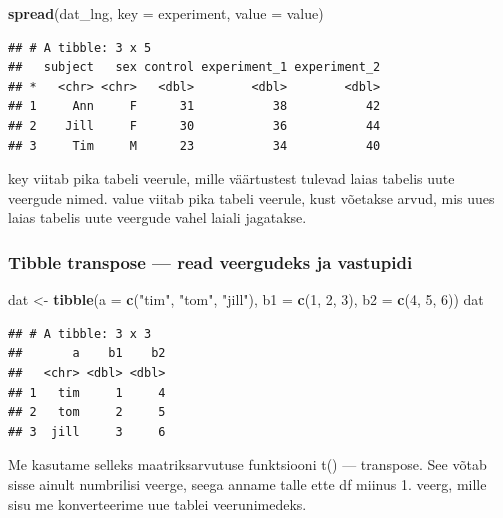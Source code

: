 \documentclass[]{book}
\newenvironment{Shaded}{\begin{snugshade}}{\end{snugshade}}
\newcommand{\KeywordTok}[1]{\textcolor[rgb]{0.13,0.29,0.53}{\textbf{#1}}}
\newcommand{\DataTypeTok}[1]{\textcolor[rgb]{0.13,0.29,0.53}{#1}}
\newcommand{\DecValTok}[1]{\textcolor[rgb]{0.00,0.00,0.81}{#1}}
\newcommand{\StringTok}[1]{\textcolor[rgb]{0.31,0.60,0.02}{#1}}
\newcommand{\NormalTok}[1]{#1}
\begin{document}
\begin{Shaded}
\begin{Highlighting}[]
\KeywordTok{spread}\NormalTok{(dat_lng, }\DataTypeTok{key =}\NormalTok{ experiment, }\DataTypeTok{value =}\NormalTok{ value)}
\end{Highlighting}
\end{Shaded}

\begin{verbatim}
## # A tibble: 3 x 5
##   subject   sex control experiment_1 experiment_2
## *   <chr> <chr>   <dbl>        <dbl>        <dbl>
## 1     Ann     F      31           38           42
## 2    Jill     F      30           36           44
## 3     Tim     M      23           34           40
\end{verbatim}

key viitab pika tabeli veerule, mille väärtustest tulevad laias tabelis
uute veergude nimed. value viitab pika tabeli veerule, kust võetakse
arvud, mis uues laias tabelis uute veergude vahel laiali jagatakse.

\subsubsection{Tibble transpose --- read veergudeks ja
vastupidi}\label{tibble-transpose-read-veergudeks-ja-vastupidi}

\begin{Shaded}
\begin{Highlighting}[]
\NormalTok{dat <-}\StringTok{ }\KeywordTok{tibble}\NormalTok{(}\DataTypeTok{a =} \KeywordTok{c}\NormalTok{(}\StringTok{"tim"}\NormalTok{, }\StringTok{"tom"}\NormalTok{, }\StringTok{"jill"}\NormalTok{), }\DataTypeTok{b1 =} \KeywordTok{c}\NormalTok{(}\DecValTok{1}\NormalTok{, }\DecValTok{2}\NormalTok{, }\DecValTok{3}\NormalTok{), }\DataTypeTok{b2 =} \KeywordTok{c}\NormalTok{(}\DecValTok{4}\NormalTok{, }\DecValTok{5}\NormalTok{, }\DecValTok{6}\NormalTok{))}
\NormalTok{dat}
\end{Highlighting}
\end{Shaded}

\begin{verbatim}
## # A tibble: 3 x 3
##       a    b1    b2
##   <chr> <dbl> <dbl>
## 1   tim     1     4
## 2   tom     2     5
## 3  jill     3     6
\end{verbatim}

Me kasutame selleks maatriksarvutuse funktsiooni t() --- transpose. See
võtab sisse ainult numbrilisi veerge, seega anname talle ette df miinus
1. veerg, mille sisu me konverteerime uue tablei veerunimedeks.
\end{document}
